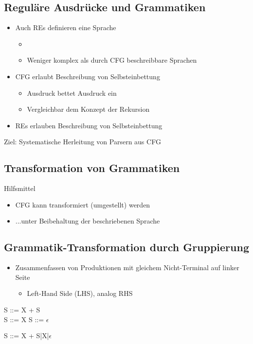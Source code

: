 \subsection{Reguläre Ausdrücke und Grammatiken}
\begin{itemize}
    \item Auch REs definieren eine Sprache
    \begin{itemize}
        \item {}
        \item Weniger komplex als durch CFG beschreibbare Sprachen
    \end{itemize}
    \item CFG erlaubt Beschreibung von Selbsteinbettung
    \begin{itemize}
        \item Ausdruck  bettet Ausdruck  ein
        \item Vergleichbar dem Konzept der Rekursion
    \end{itemize}
    \item REs erlauben  Beschreibung von Selbsteinbettung
\end{itemize}
Ziel: Systematische Herleitung von Parsern aus CFG

\subsection{Transformation von Grammatiken}
Hilfsmittel
\begin{itemize}
    \item CFG kann transformiert (umgestellt) werden
    \item ...unter Beibehaltung der beschriebenen Sprache
\end{itemize}

\subsection{Grammatik-Transformation durch Gruppierung}
\begin{itemize}
    \item Zusammenfassen von Produktionen mit gleichem Nicht-Terminal auf linker Seite
    \begin{itemize}
        \item Left-Hand Side (LHS), analog RHS
    \end{itemize}
\end{itemize}
\begin{defBox}[title=Vor Transformation]
    S ::= X + S\\
    S ::= X
    S ::= $\epsilon$
\end{defBox}
\begin{defBox}[title=Nach Gruppierung]
    S ::= X + S|X|$\epsilon$
\end{defBox}

